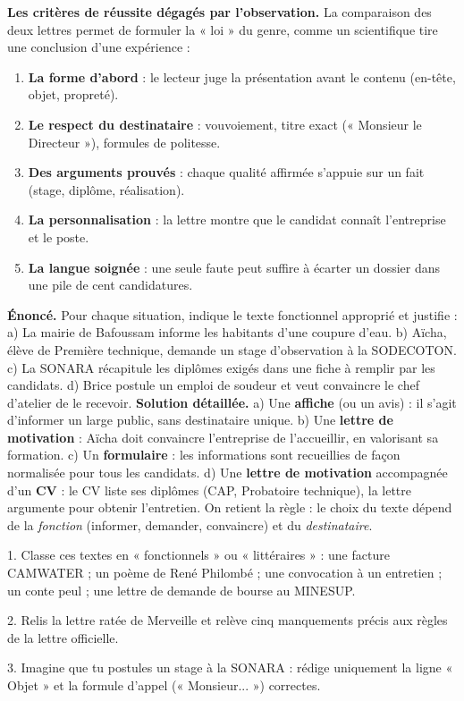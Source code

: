 \documentclass[11pt]{article}
\begin{document}
\textbf{Les critères de réussite dégagés par l'observation.} La comparaison des deux lettres permet de formuler la « loi » du genre, comme un scientifique tire une conclusion d'une expérience :

\begin{enumerate}
\item \textbf{La forme d'abord} : le lecteur juge la présentation avant le contenu (en-tête, objet, propreté).
\item \textbf{Le respect du destinataire} : vouvoiement, titre exact (« Monsieur le Directeur »), formules de politesse.
\item \textbf{Des arguments prouvés} : chaque qualité affirmée s'appuie sur un fait (stage, diplôme, réalisation).
\item \textbf{La personnalisation} : la lettre montre que le candidat connaît l'entreprise et le poste.
\item \textbf{La langue soignée} : une seule faute peut suffire à écarter un dossier dans une pile de cent candidatures.
\end{enumerate}

\begin{exoresolu}
\textbf{Énoncé.} Pour chaque situation, indique le texte fonctionnel approprié et justifie : a) La mairie de Bafoussam informe les habitants d'une coupure d'eau. b) Aïcha, élève de Première technique, demande un stage d'observation à la SODECOTON. c) La SONARA récapitule les diplômes exigés dans une fiche à remplir par les candidats. d) Brice postule un emploi de soudeur et veut convaincre le chef d'atelier de le recevoir.
\tcblower
\textbf{Solution détaillée.} a) Une \textbf{affiche} (ou un avis) : il s'agit d'informer un large public, sans destinataire unique. b) Une \textbf{lettre de motivation} : Aïcha doit convaincre l'entreprise de l'accueillir, en valorisant sa formation. c) Un \textbf{formulaire} : les informations sont recueillies de façon normalisée pour tous les candidats. d) Une \textbf{lettre de motivation} accompagnée d'un \textbf{CV} : le CV liste ses diplômes (CAP, Probatoire technique), la lettre argumente pour obtenir l'entretien. On retient la règle : le choix du texte dépend de la \emph{fonction} (informer, demander, convaincre) et du \emph{destinataire}.
\end{exoresolu}

\begin{exercice}
1. Classe ces textes en « fonctionnels » ou « littéraires » : une facture CAMWATER ; un poème de René Philombé ; une convocation à un entretien ; un conte peul ; une lettre de demande de bourse au MINESUP.
\par
2. Relis la lettre ratée de Merveille et relève cinq manquements précis aux règles de la lettre officielle.
\par
3. Imagine que tu postules un stage à la SONARA : rédige uniquement la ligne « Objet » et la formule d'appel (« Monsieur... ») correctes.
\end{exercice}
\end{document}
